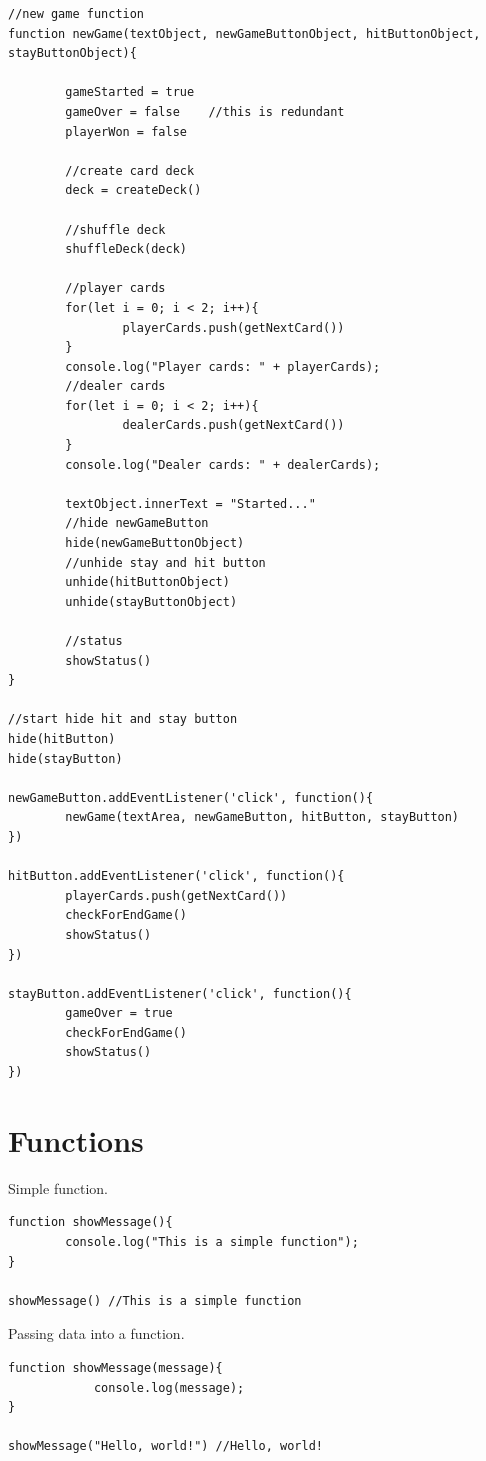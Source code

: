 \documentclass[10pt, a4paper, twocolumn]{article}
\begin{document}
\begin{lstlisting}
//new game function
function newGame(textObject, newGameButtonObject, hitButtonObject, stayButtonObject){

		gameStarted = true
		gameOver = false    //this is redundant
		playerWon = false

		//create card deck
		deck = createDeck()

		//shuffle deck
		shuffleDeck(deck)

		//player cards
		for(let i = 0; i < 2; i++){
				playerCards.push(getNextCard())
		}
		console.log("Player cards: " + playerCards);
		//dealer cards
		for(let i = 0; i < 2; i++){
				dealerCards.push(getNextCard())
		}
		console.log("Dealer cards: " + dealerCards);

		textObject.innerText = "Started..."
		//hide newGameButton
		hide(newGameButtonObject)
		//unhide stay and hit button
		unhide(hitButtonObject)
		unhide(stayButtonObject)

		//status
		showStatus()
}

//start hide hit and stay button
hide(hitButton)
hide(stayButton)

newGameButton.addEventListener('click', function(){
		newGame(textArea, newGameButton, hitButton, stayButton)
})

hitButton.addEventListener('click', function(){
		playerCards.push(getNextCard())
		checkForEndGame()
		showStatus()
})

stayButton.addEventListener('click', function(){
		gameOver = true
		checkForEndGame()
		showStatus()
})

\end{lstlisting}

\section{Functions}

Simple function.

\begin{lstlisting}
function showMessage(){
		console.log("This is a simple function");
}

showMessage() //This is a simple function
\end{lstlisting}

Passing data into a function.

\begin{lstlisting}
function showMessage(message){
			console.log(message);
}

showMessage("Hello, world!") //Hello, world!

\end{lstlisting}
\end{document}
